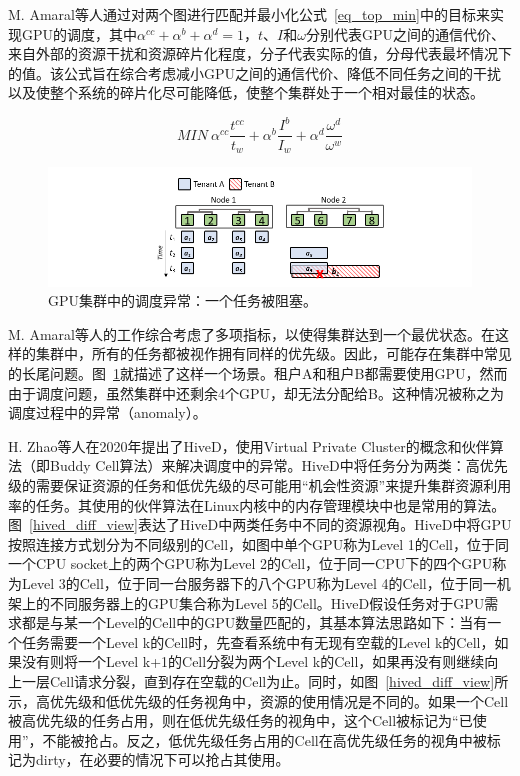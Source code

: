 M. Amaral等人通过对两个图进行匹配并最小化公式~\ref{eq_top_min}中的目标来实现GPU的调度，其中$\alpha^{cc}+\alpha^b+\alpha^d=1$，$t$、$I$和$\omega$分别代表GPU之间的通信代价、来自外部的资源干扰和资源碎片化程度，分子代表实际的值，分母代表最坏情况下的值。该公式旨在综合考虑减小GPU之间的通信代价、降低不同任务之间的干扰以及使整个系统的碎片化尽可能降低，使整个集群处于一个相对最佳的状态。

\begin{equation}\label{eq_top_min}
    MIN\ \alpha^{cc}\frac{t^{cc}}{t_w}+\alpha^b\frac{I^b}{I_w}+\alpha^d\frac{\omega^d}{\omega^w}
\end{equation}

\begin{figure}[h]
    \centerline{\includegraphics[width=\textwidth]{figures/hived-pendding.png}}
    \caption{GPU集群中的调度异常：一个任务被阻塞。}
    \label{hived_pending}
\end{figure}

M. Amaral等人的工作综合考虑了多项指标，以使得集群达到一个最优状态。在这样的集群中，所有的任务都被视作拥有同样的优先级。因此，可能存在集群中常见的长尾问题。图~\ref{hived_pending}就描述了这样一个场景。租户A和租户B都需要使用GPU，然而由于调度问题，虽然集群中还剩余4个GPU，却无法分配给B。这种情况被称之为调度过程中的异常（anomaly）。

H. Zhao等人在2020年提出了HiveD\parencite{zhao2020hived}，使用Virtual Private Cluster的概念和伙伴算法（即Buddy Cell算法）来解决调度中的异常。HiveD中将任务分为两类：高优先级的需要保证资源的任务和低优先级的尽可能用“机会性资源”来提升集群资源利用率的任务。其使用的伙伴算法在Linux内核中的内存管理模块中也是常用的算法。图~\ref{hived_diff_view}表达了HiveD中两类任务中不同的资源视角。HiveD中将GPU按照连接方式划分为不同级别的Cell，如图中单个GPU称为Level 1的Cell，位于同一个CPU socket上的两个GPU称为Level 2的Cell，位于同一CPU下的四个GPU称为Level 3的Cell，位于同一台服务器下的八个GPU称为Level 4的Cell，位于同一机架上的不同服务器上的GPU集合称为Level 5的Cell。HiveD假设任务对于GPU需求都是与某一个Level的Cell中的GPU数量匹配的，其基本算法思路如下：当有一个任务需要一个Level k的Cell时，先查看系统中有无现有空载的Level k的Cell，如果没有则将一个Level k+1的Cell分裂为两个Level k的Cell，如果再没有则继续向上一层Cell请求分裂，直到存在空载的Cell为止。同时，如图~\ref{hived_diff_view}所示，高优先级和低优先级的任务视角中，资源的使用情况是不同的。如果一个Cell被高优先级的任务占用，则在低优先级任务的视角中，这个Cell被标记为“已使用”，不能被抢占。反之，低优先级任务占用的Cell在高优先级任务的视角中被标记为dirty，在必要的情况下可以抢占其使用。

